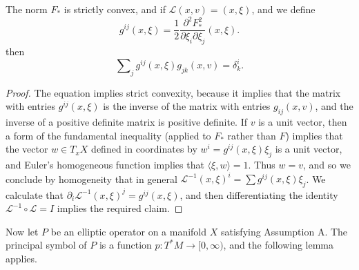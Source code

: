 \begin{corollary}
  The norm $F_*$ is strictly convex, and if $\mathcal{L}(x,v) = (x,\xi)$, and we define
  \[ g^{ij}(x,\xi) = \frac{1}{2} \frac{\partial^2 F_*^2}{\partial \xi_i \partial \xi_j}(x,\xi). \]
  then
  \[ \sum\nolimits_j g^{ij}(x,\xi) g_{jk}(x,v) = \delta^i_k. \]
\end{corollary}
\begin{proof}
  The equation implies strict convexity, because it implies that the matrix with entries $g^{ij}(x,\xi)$ is the inverse of the matrix with entries $g_{ij}(x,v)$, and the inverse of a positive definite matrix is positive definite. If $v$ is a unit vector, then a form of the fundamental inequality (applied to $F_*$ rather than $F$) implies that the vector $w \in T_x X$ defined in coordinates by $w^i = g^{ij}(x,\xi) \xi_j$ is a unit vector, and Euler's homogeneous function implies that $\langle \xi, w \rangle = 1$. Thus $w = v$, and so we conclude by homogeneity that in general $\mathcal{L}^{-1}(x,\xi)^i = \sum g^{ij}(x,\xi) \xi_j$. We calculate that $\partial_i \mathcal{L}^{-1}(x,\xi)^j = g^{ij}(x,\xi)$, and then differentiating the identity $\mathcal{L}^{-1} \circ \mathcal{L} = I$ implies the required claim.
\end{proof}

Now let $P$ be an elliptic operator on a manifold $X$ satisfying Assumption A. The principal symbol of $P$ is a function $p: T^* M \to [0,\infty)$, and the following lemma applies.

